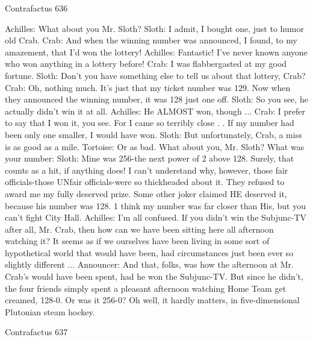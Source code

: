 Contrafactus                                                                               636

Achilles: What about you Mr. Sloth?
Sloth: I admit, I bought one, just to humor old Crab.
Crab: And when the winning number was announced, I found, to my amazement, that I'd
   won the lottery!
Achilles: Fantastic! I've never known anyone who won anything in a lottery before!
Crab: I was flabbergasted at my good fortune.
Sloth: Don't you have something else to tell us about that lottery, Crab?
Crab: Oh, nothing much. It's just that my ticket number was 129. Now when they
   announced the winning number, it was 128 just one off. Sloth: So you see, he actually
   didn't win it at all. Achilles: He ALMOST won, though ...
Crab: I prefer to say that I won it, you see. For I came so terribly close . . If my number
   had been only one smaller, I would have won. Sloth: But unfortunately, Crab, a miss is
   as good as a mile.
Tortoise: Or as bad. What about you, Mr. Sloth? What was your number:
Sloth: Mine was 256-the next power of 2 above 128. Surely, that counts as a hit, if
   anything does! I can't understand why, however, those fair officials-those UNfair
   officials-were so thickheaded about it. They refused to award me my fully deserved
   prize. Some other joker claimed HE deserved it, because his number was 128. 1 think
   my number was far closer than His, but you can't fight City Hall.
Achilles: I'm all confused. If you didn't win the Subjunc-TV after all, Mr. Crab, then how
   can we have been sitting here all afternoon watching it? It seems as if we ourselves
   have been living in some sort of hypothetical world that would have been, had
   circumstances just been ever so slightly different ...
Announcer: And that, folks, was how the afternoon at Mr. Crab's would have been spent,
   had he won the Subjunc-TV. But since he didn't, the four friends simply spent a
   pleasant afternoon watching Home Team get creamed, 128-0. Or was it 256-0? Oh
   well, it hardly matters, in five-dimensional Plutonian steam hockey.




Contrafactus                                                                           637


